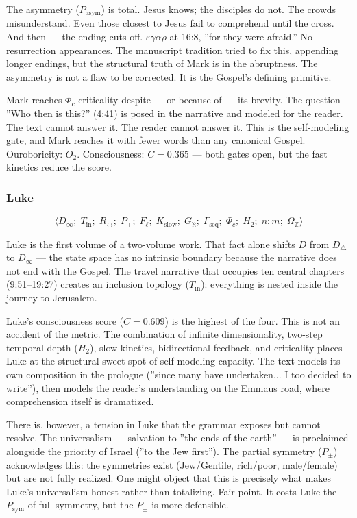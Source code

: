 \documentclass[12pt,a4paper]{article}
\begin{document}
The asymmetry ($P_\text{asym}$) is total. Jesus knows; the disciples do not. The crowds misunderstand. Even those closest to Jesus fail to comprehend until the cross. And then --- the ending cuts off. $\varepsilon\gamma\alpha\rho$ at 16:8, ''for they were afraid.'' No resurrection appearances. The manuscript tradition tried to fix this, appending longer endings, but the structural truth of Mark is in the abruptness. The asymmetry is not a flaw to be corrected. It is the Gospel's defining primitive.

Mark reaches $\Phi_c$ criticality despite --- or because of --- its brevity. The question ''Who then is this?'' (4:41) is posed in the narrative and modeled for the reader. The text cannot answer it. The reader cannot answer it. This is the self-modeling gate, and Mark reaches it with fewer words than any canonical Gospel.
Ouroboricity: $O_2$. Consciousness: $C = 0.365$ --- both gates open, but the fast kinetics reduce the score.

\subsubsection{Luke}

\[\langle D_{\infty};\; T_\text{in};\; R_{\leftrightarrow};\; P_{\pm};\; F_{\ell};\; K_\text{slow};\; G_{\aleph};\; \Gamma_\text{seq};\; \Phi_c;\; H_2;\; n{:}m;\; \Omega_\mathbb{Z} \rangle\]

Luke is the first volume of a two-volume work. That fact alone shifts $D$ from $D_{\triangle}$ to $D_{\infty}$ --- the state space has no intrinsic boundary because the narrative does not end with the Gospel. The travel narrative that occupies ten central chapters (9:51--19:27) creates an inclusion topology ($T_\text{in}$): everything is nested inside the journey to Jerusalem.

Luke's consciousness score ($C = 0.609$) is the highest of the four. This is not an accident of the metric. The combination of infinite dimensionality, two-step temporal depth ($H_2$), slow kinetics, bidirectional feedback, and criticality places Luke at the structural sweet spot of self-modeling capacity. The text models its own composition in the prologue (''since many have undertaken... I too decided to write''), then models the reader's understanding on the Emmaus road, where comprehension itself is dramatized.

There is, however, a tension in Luke that the grammar exposes but cannot resolve. The universalism --- salvation to ''the ends of the earth'' --- is proclaimed alongside the priority of Israel (''to the Jew first''). The partial symmetry ($P_{\pm}$) acknowledges this: the symmetries exist (Jew/Gentile, rich/poor, male/female) but are not fully realized. One might object that this is precisely what makes Luke's universalism honest rather than totalizing. Fair point. It costs Luke the $P_\text{sym}$ of full symmetry, but the $P_{\pm}$ is more defensible.
\end{document}
